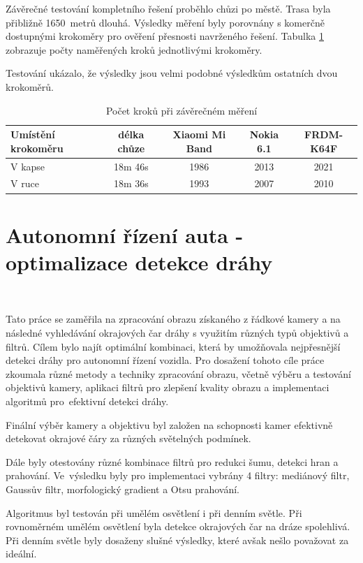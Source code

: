 Závěrečné testování kompletního řešení proběhlo chůzi po městě. Trasa byla přibližně 1650~metrů dlouhá. Výsledky měření byly porovnány s komerčně dostupnými krokoměry pro ověření přesnosti navrženého řešení. Tabulka \ref{tab:2}  zobrazuje počty naměřených kroků jednotlivými krokoměry.

Testování ukázalo, že výsledky jsou velmi podobné výsledkům ostatních dvou krokoměrů\cite{krokomer}.

\begin{table}[!htbp]
	\centering
	\begin{tabular}{lcccc}
		\toprule
		Umístění krokoměru & délka chůze & Xiaomi Mi Band & Nokia 6.1 & FRDM-K64F \\
		\midrule
		V kapse            & 18m 46s     & 1986           & 2013      & 2021      \\
		V ruce             & 18m 36s     & 1993           & 2007      & 2010      \\
		\bottomrule
	\end{tabular}
	\caption{Počet kroků při závěrečném měření%
	}
	\label{tab:2}
\end{table}

\section{Autonomní řízení auta - optimalizace detekce dráhy}\

Tato práce se zaměřila na zpracování obrazu získaného z řádkové kamery a na následné vyhledávání okrajových čar dráhy s využitím různých typů objektivů a filtrů. Cílem bylo najít optimální kombinaci, která by umožňovala nejpřesnější detekci dráhy pro autonomní řízení vozidla. Pro dosažení tohoto cíle práce zkoumala různé metody a techniky zpracování obrazu, včetně výběru a testování objektivů kamery, aplikaci filtrů pro zlepšení kvality obrazu a implementaci algoritmů pro~efektivní detekci dráhy.

Finální výběr kamery a objektivu byl založen na schopnosti kamer efektivně detekovat okrajové čáry za různých světelných podmínek.

Dále byly otestovány různé kombinace filtrů pro redukci šumu, detekci hran a prahování. Ve~výsledku byly pro implementaci vybrány 4 filtry: mediánový filtr, Gaussův filtr, morfologický gradient a Otsu prahování.

Algoritmus byl testován při umělém osvětlení i při denním světle. Při rovnoměrném umělém osvětlení byla detekce okrajových čar na dráze spolehlivá. Při denním světle byly dosaženy slušné výsledky, které avšak nešlo považovat za ideální\cite{draha}.


